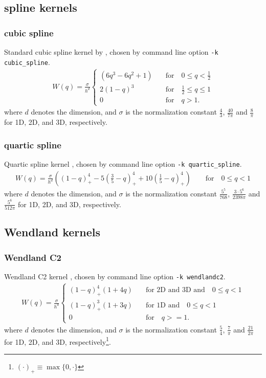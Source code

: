 \documentclass[10pt,fleqn,twoside]{article}
\begin{document}
\subsection{spline kernels}
\subsubsection{cubic spline}
Standard cubic spline kernel by \cite{1985A&A...149..135M}, chosen by command line option \texttt{-k
cubic\_spline}.
\begin{align}
    W(q) = \frac{\sigma}{h^d} \left\{
    \begin{array}{ll}
        ( 6 q^3 - 6q^2  + 1 ) & \quad \mbox{for} \quad 0 \leq q < \frac{1}{2} \\
        2(1 - q)^3 & \quad \mbox{for} \quad \frac{1}{2} \leq q \leq 1 \\
        0 & \quad \mbox{for} \quad q > 1.
    \end{array}
    \right.
\end{align}
where $d$ denotes the dimension, and $\sigma$ is the normalization constant $\frac{4}{3}$,
$\frac{40}{7\pi}$ and $\frac{8}{\pi}$ for 1D, 2D, and 3D, respectively.
\subsubsection{quartic spline}
Quartic spline kernel \citep{2012MNRAS.425.1068D}, chosen by command line option \texttt{-k
quartic\_spline}.
\begin{align}
    W(q) = \frac{\sigma}{h^d} \left( \left(1-q\right)_+^4 -5\left(\frac{3}{5}-q\right)_+^4 +
    10\left(\frac{1}{5}-q\right)_+^4\right) \qquad \mbox{for} \quad 0 \leq q < 1
\end{align}
where $d$ denotes the dimension, and $\sigma$ is the normalization constant $\frac{5^5}{768}$,
$\frac{3\cdot5^6}{2398\pi}$ and $\frac{5^6}{512\pi}$ for 1D, 2D, and 3D, respectively.


\subsection{Wendland kernels}
\subsubsection{Wendland C2}
Wendland C2 kernel \citep{2012MNRAS.425.1068D}, chosen by command line option \texttt{-k
wendlandc2}.
\begin{align}
    W(q) = \frac{\sigma}{h^d} \left\{
    \begin{array}{ll}
        (1-q)_+^4 (1+4q) & \quad \mbox{for 2D and 3D and} \quad 0 \leq  q < 1 \\
        (1-q)_+^3 (1+3q) & \quad \mbox{for 1D and} \quad 0 \leq  q < 1 \\
        0 & \quad \mbox{for} \quad q >= 1.
    \end{array}
    \right.
\end{align}
where $d$ denotes the dimension, and $\sigma$ is the normalization constant $\frac{5}{4}$,
$\frac{7}{\pi}$ and $\frac{21}{2\pi}$ for 1D, 2D, and 3D, respectively\footnote{$(\cdot)_+ \equiv
\max\{0,\cdot\}$}.
\end{document}
